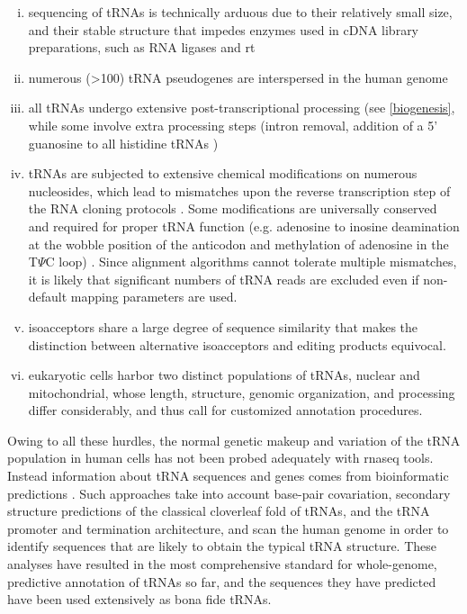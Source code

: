 \documentclass[12pt]{rockefeller}
\begin{document}
\begin{enumerate}[i)]
\item sequencing of tRNAs is technically arduous due to their relatively small size, and their stable structure that impedes enzymes used in cDNA library preparations, such as RNA ligases and \gls{rt}
\item numerous (>100) tRNA pseudogenes are interspersed in the human genome \cite{Lowe:1997uc,Chan:2009dz}
\item all tRNAs undergo extensive post-transcriptional processing (see \ref{biogenesis}, while some involve extra processing steps (intron removal, addition of a 5’ guanosine to all histidine tRNAs \cite{Gu:2003jj})
\item tRNAs are subjected to extensive chemical modifications on numerous nucleosides, which lead to mismatches upon the reverse transcription step of the RNA cloning protocols \cite{Jackman:2012ki,Lee:2013cg}. Some modifications are universally conserved and required for proper tRNA function (e.g. adenosine to inosine deamination at the wobble position of the anticodon and methylation of adenosine in the T$\Psi$C loop) \cite{Jackman:2012ki,Gustilo:2008ge}. Since alignment algorithms cannot tolerate multiple mismatches, it is likely that significant numbers of tRNA reads are excluded even if non-default mapping parameters are used.
\item \gls{isoacceptors} share a large degree of sequence similarity that makes the distinction between alternative isoacceptors and editing products equivocal. 
\item eukaryotic cells harbor two distinct populations of tRNAs, nuclear and mitochondrial, whose length, structure, genomic organization, and processing differ considerably, and thus call for customized annotation procedures.
\end{enumerate}

Owing to all these hurdles, the normal genetic makeup and variation of the tRNA population in human cells has not been probed adequately with \gls{rnaseq} tools. Instead information about tRNA sequences and genes comes from bioinformatic predictions \cite{Lowe:1997uc,Chan:2009dz}. Such approaches take into account base-pair covariation, secondary structure predictions of the classical cloverleaf fold of tRNAs, and the tRNA promoter and termination architecture, and scan the human genome in order to identify sequences that are likely to obtain the typical tRNA structure. These analyses have resulted in the most comprehensive standard for whole-genome, predictive annotation of tRNAs so far, and the sequences they have predicted have been used extensively as bona fide tRNAs.
\end{document}
